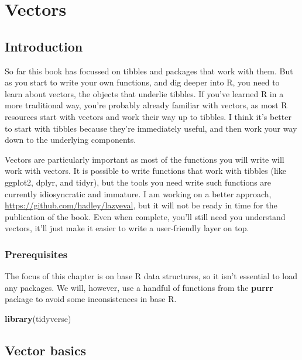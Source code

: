 \documentclass[]{book}
\newenvironment{Shaded}{\begin{snugshade}}{\end{snugshade}}
\newcommand{\KeywordTok}[1]{\textcolor[rgb]{0.13,0.29,0.53}{\textbf{{#1}}}}
\newcommand{\NormalTok}[1]{{#1}}
\begin{document}
\hypertarget{vectors}{\chapter{Vectors}\label{vectors}}

\section{Introduction}\label{introduction-13}

So far this book has focussed on tibbles and packages that work with
them. But as you start to write your own functions, and dig deeper into
R, you need to learn about vectors, the objects that underlie tibbles.
If you've learned R in a more traditional way, you're probably already
familiar with vectors, as most R resources start with vectors and work
their way up to tibbles. I think it's better to start with tibbles
because they're immediately useful, and then work your way down to the
underlying components.

Vectors are particularly important as most of the functions you will
write will work with vectors. It is possible to write functions that
work with tibbles (like ggplot2, dplyr, and tidyr), but the tools you
need write such functions are currently idiosyncratic and immature. I am
working on a better approach, \url{https://github.com/hadley/lazyeval},
but it will not be ready in time for the publication of the book. Even
when complete, you'll still need you understand vectors, it'll just make
it easier to write a user-friendly layer on top.

\subsection{Prerequisites}\label{prerequisites-13}

The focus of this chapter is on base R data structures, so it isn't
essential to load any packages. We will, however, use a handful of
functions from the \textbf{purrr} package to avoid some inconsistences
in base R.

\begin{Shaded}
\begin{Highlighting}[]
\KeywordTok{library}\NormalTok{(tidyverse)}
\end{Highlighting}
\end{Shaded}

\section{Vector basics}\label{vector-basics}
\end{document}
